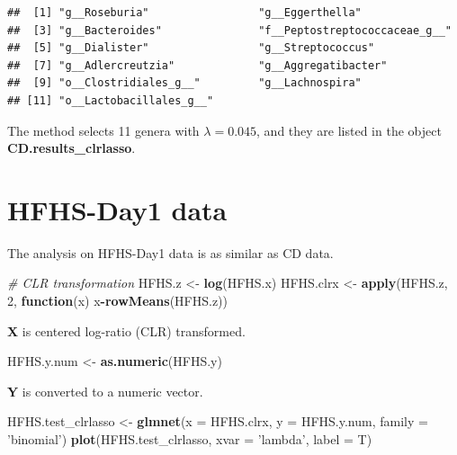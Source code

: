 \documentclass[openany]{book}
\newenvironment{Shaded}{\begin{snugshade}}{\end{snugshade}}
\newcommand{\KeywordTok}[1]{\textcolor[rgb]{0.13,0.29,0.53}{\textbf{#1}}}
\newcommand{\DataTypeTok}[1]{\textcolor[rgb]{0.13,0.29,0.53}{#1}}
\newcommand{\DecValTok}[1]{\textcolor[rgb]{0.00,0.00,0.81}{#1}}
\newcommand{\StringTok}[1]{\textcolor[rgb]{0.31,0.60,0.02}{#1}}
\newcommand{\CommentTok}[1]{\textcolor[rgb]{0.56,0.35,0.01}{\textit{#1}}}
\newcommand{\ControlFlowTok}[1]{\textcolor[rgb]{0.13,0.29,0.53}{\textbf{#1}}}
\newcommand{\OperatorTok}[1]{\textcolor[rgb]{0.81,0.36,0.00}{\textbf{#1}}}
\newcommand{\NormalTok}[1]{#1}
\begin{document}
\begin{Shaded}
\end{Shaded}

\begin{verbatim}
##  [1] "g__Roseburia"                 "g__Eggerthella"              
##  [3] "g__Bacteroides"               "f__Peptostreptococcaceae_g__"
##  [5] "g__Dialister"                 "g__Streptococcus"            
##  [7] "g__Adlercreutzia"             "g__Aggregatibacter"          
##  [9] "o__Clostridiales_g__"         "g__Lachnospira"              
## [11] "o__Lactobacillales_g__"
\end{verbatim}

The method selects 11 genera with \(\lambda = 0.045\), and they are
listed in the object \textbf{CD.results\_clrlasso}.

\section{HFHS-Day1 data}\label{hfhs-day1-data-1}

The analysis on HFHS-Day1 data is as similar as CD data.

\begin{Shaded}
\begin{Highlighting}[]
\CommentTok{# CLR transformation}
\NormalTok{HFHS.z <-}\StringTok{ }\KeywordTok{log}\NormalTok{(HFHS.x)}
\NormalTok{HFHS.clrx <-}\StringTok{ }\KeywordTok{apply}\NormalTok{(HFHS.z, }\DecValTok{2}\NormalTok{, }\ControlFlowTok{function}\NormalTok{(x) x}\OperatorTok{-}\KeywordTok{rowMeans}\NormalTok{(HFHS.z))}
\end{Highlighting}
\end{Shaded}

\textbf{X} is centered log-ratio (CLR) transformed.

\begin{Shaded}
\begin{Highlighting}[]
\NormalTok{HFHS.y.num <-}\StringTok{ }\KeywordTok{as.numeric}\NormalTok{(HFHS.y)}
\end{Highlighting}
\end{Shaded}

\textbf{Y} is converted to a numeric vector.

\begin{Shaded}
\begin{Highlighting}[]
\NormalTok{HFHS.test_clrlasso <-}\StringTok{ }\KeywordTok{glmnet}\NormalTok{(}\DataTypeTok{x =}\NormalTok{ HFHS.clrx, }\DataTypeTok{y =}\NormalTok{ HFHS.y.num, }\DataTypeTok{family =} \StringTok{'binomial'}\NormalTok{)}
\KeywordTok{plot}\NormalTok{(HFHS.test_clrlasso, }\DataTypeTok{xvar =} \StringTok{'lambda'}\NormalTok{, }\DataTypeTok{label =}\NormalTok{ T)}
\end{Highlighting}
\end{Shaded}
\end{document}
